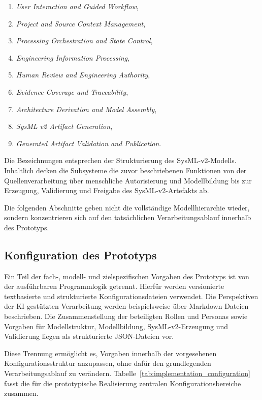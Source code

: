 \begin{enumerate}
    \item \emph{User Interaction and Guided Workflow},
    \item \emph{Project and Source Context Management},
    \item \emph{Processing Orchestration and State Control},
    \item \emph{Engineering Information Processing},
    \item \emph{Human Review and Engineering Authority},
    \item \emph{Evidence Coverage and Traceability},
    \item \emph{Architecture Derivation and Model Assembly},
    \item \emph{SysML v2 Artifact Generation},
    \item \emph{Generated Artifact Validation and Publication}.
\end{enumerate}

Die Bezeichnungen entsprechen der Strukturierung des SysML-v2-Modells.
Inhaltlich decken die Subsysteme die zuvor beschriebenen Funktionen von der
Quellenverarbeitung über menschliche Autorisierung und Modellbildung bis zur
Erzeugung, Validierung und Freigabe des SysML-v2-Artefakts ab.

Die folgenden Abschnitte geben nicht die vollständige Modellhierarchie
wieder, sondern konzentrieren sich auf den tatsächlichen
Verarbeitungsablauf innerhalb des Prototyps.

\subsection{Konfiguration des Prototyps}
\label{sec:implementation_configuration}

Ein Teil der fach-, modell- und zielspezifischen Vorgaben des Prototyps ist
von der ausführbaren Programmlogik getrennt. Hierfür werden versionierte
textbasierte und strukturierte Konfigurationsdateien verwendet. Die
Perspektiven der KI-gestützten Verarbeitung werden beispielsweise über
Markdown-Dateien beschrieben. Die Zusammenstellung der beteiligten Rollen
und Personas sowie Vorgaben für Modellstruktur, Modellbildung,
SysML-v2-Erzeugung und Validierung liegen als strukturierte JSON-Dateien vor.

Diese Trennung ermöglicht es, Vorgaben innerhalb der vorgesehenen
Konfigurationsstruktur anzupassen, ohne dafür den grundlegenden
Verarbeitungsablauf zu verändern.
Tabelle~\ref{tab:implementation_configuration} fasst die für die
prototypische Realisierung zentralen Konfigurationsbereiche zusammen.

